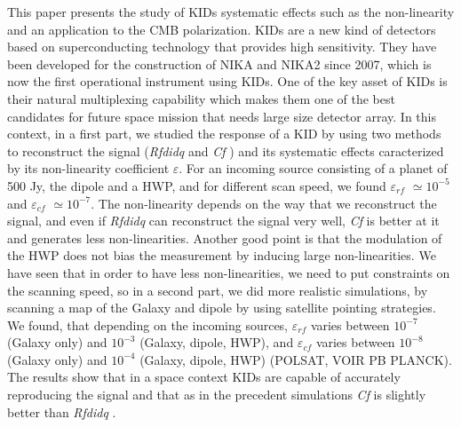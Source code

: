 \documentclass[twocolumn, traditabstract]{aa}
\newcommand{\eps}{$\varepsilon$}
\newcommand{\rf}{{\it Rfdidq} }
\newcommand{\cf}{{\it Cf} }
\begin{document}
This paper presents the study of KIDs systematic effects such as the non-linearity and an application to the CMB polarization. 
KIDs are a new kind of detectors based on superconducting technology that provides high sensitivity. They have been developed for the construction of NIKA and NIKA2 since 2007, which is now the first operational instrument using KIDs. One of the key asset of KIDs is their natural multiplexing capability which makes them one of the best candidates for future space mission that needs large size detector array. In this context, in a first part, we studied the response of a KID by using two methods to reconstruct the signal (\rf and \cf) and its systematic effects caracterized by its non-linearity coefficient \eps. For an incoming source consisting of a planet of 500 Jy, the dipole and a HWP, and for different scan speed, we found $\varepsilon_{rf}$ $\simeq 10^{-5}$ and $\varepsilon_{cf}$ $\simeq 10^{-7}$. The non-linearity depends on the way that we reconstruct the signal, and even if \rf can reconstruct the signal very well, \cf is better at it and generates less non-linearities. Another good point is that the modulation of the HWP does not bias the measurement by inducing large non-linearities. We have seen that in order to have less non-linearities, we need to put constraints on the scanning speed, so in a second part, we did more realistic simulations, by scanning a map of the Galaxy and dipole by using satellite pointing strategies. We found, that depending on the incoming sources, $\varepsilon_{rf}$ varies between $10^{-7}$ (Galaxy only) and $10^{-3}$ (Galaxy, dipole, HWP), and $\varepsilon_{cf}$ varies between $10^{-8}$ (Galaxy only) and $10^{-4}$ (Galaxy, dipole, HWP) (POLSAT, VOIR PB PLANCK). The results show that in a space context KIDs are capable of accurately reproducing the signal and that as in the precedent simulations \cf is slightly better than \rf.\\
\end{document}
